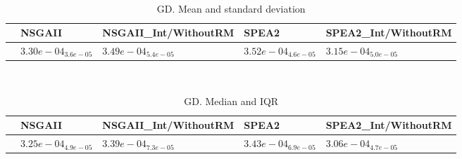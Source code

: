 \documentclass{article}
\begin{document}
\
\begin{table}
\caption{GD. Mean and standard deviation}
\label{table:mean.GD}
\centering
\begin{scriptsize}
\begin{tabular}{lllll}
\hline & NSGAII & NSGAII\_Int/WithoutRM & SPEA2 &  SPEA2\_Int/WithoutRM\\
\hline
 & \cellcolor{gray25}$  3.30e-04_{ 3.6e-05}$ & $  3.49e-04_{ 5.4e-05}$ & $  3.52e-04_{ 4.6e-05}$ & \cellcolor{gray95}$  3.15e-04_{ 5.0e-05}$ \\
\hline
\end{tabular}
\end{scriptsize}
\end{table}
\
\begin{table}
\caption{GD. Median and IQR}
\label{table:median.GD}
\begin{scriptsize}
\centering
\begin{tabular}{lllll}
\hline & NSGAII & NSGAII\_Int/WithoutRM & SPEA2 &  SPEA2\_Int/WithoutRM\\
\hline
 & \cellcolor{gray25}$  3.25e-04_{ 4.9e-05}$ & $  3.39e-04_{ 7.3e-05}$ & $  3.43e-04_{ 6.9e-05}$ & \cellcolor{gray95}$  3.06e-04_{ 4.7e-05}$ \\
\hline
\end{tabular}
\end{scriptsize}
\end{table}
\end{document}
